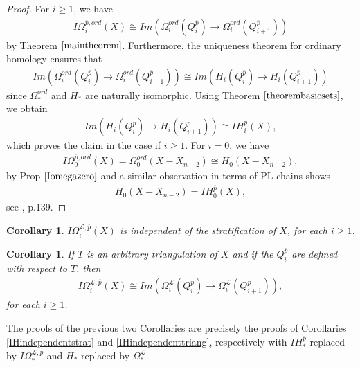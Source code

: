 \documentclass{scrreprt}
\newtheorem{corollar}[prop]{Corollary}
\begin{document}
\begin{proof}
For $i \geq 1$, we have 
\begin{align*}
 I\Omega_i^{\overline{p},ord}(X) \cong Im(\Omega_i^{ord}(Q_{i}^{\overline{p}}) \to \Omega_i^{ord}(Q_{i+1}^{\overline{p}}))
\end{align*}
by Theorem $\ref{maintheorem}$. Furthermore, the uniqueness theorem for ordinary homology ensures that
\begin{align*}
Im(\Omega_i^{ord}(Q_{i}^{\overline{p}}) \to \Omega_i^{ord}(Q_{i+1}^{\overline{p}})) \cong Im(H_i(Q_{i}^{\overline{p}}) \to H_i(Q_{i+1}^{\overline{p}}))
\end{align*}
since $\Omega_*^{ord}$ and $H_*$ are naturally isomorphic. Using Theorem $\ref{theorembasicsets}$, we obtain
\begin{align*}
Im(H_i(Q_{i}^{\overline{p}}) \to H_i(Q_{i+1}^{\overline{p}})) \cong IH_i^{\overline{p}}(X),
\end{align*}
which proves the claim in the case if $i \geq 1$. For $i=0$, we have
\begin{align*}
I\Omega_0^{\overline{p},ord}(X)=\Omega_0^{ord}(X-X_{n-2}) \cong H_0(X-X_{n-2}),
\end{align*}
by Prop $\ref{Iomegazero}$ and a similar observation in terms of PL chains shows 
\begin{align*}
 H_0(X-X_{n-2})=IH_0^{\overline{p}}(X),
\end{align*}
see \cite{GM}, p.139.
\end{proof}

\begin{corollar}\label{IOmegaindependentstrat}
$I\Omega_i^{\mathcal{L}, \overline{p}}(X)$ is independent of the stratification of $X$, for each $i \geq 1$.
\end{corollar}

\begin{corollar}
If $T$ is an arbitrary triangulation of $X$ and if the $Q_i^{\overline{p}}$ are defined with respect to $T$, then
\begin{align*}
I\Omega_i^{\mathcal{L}, \overline{p}}(X)\cong Im(\Omega_i^{\mathcal{L}}(Q_{i}^{\overline{p}}) \to \Omega_i^{\mathcal{L}}(Q_{i+1}^{\overline{p}})),
\end{align*}
for each $i \geq 1$.
\end{corollar}

The proofs of the previous two Corollaries are precisely the proofs of Corollaries \ref{IHindependentstrat} and \ref{IHindependenttriang}, respectively with $IH_*^{\overline{p}}$ replaced by $I\Omega_*^{\mathcal{L}, \overline{p}}$ and $H_*$ replaced by $\Omega_*^{\mathcal{L}}$.
\end{document}
